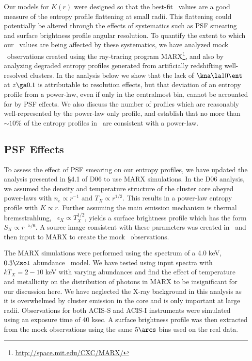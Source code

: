 Our models for $K(r)$ were designed so that the best-fit \kna\ values
are a good measure of the entropy profile flattening at small
radii. This flattening could potentially be altered through the
effects of systematics such as PSF smearing and surface brightness
profile angular resolution. To quantify the extent to which our
\kna\ values are being affected by these systematics, we have analyzed
mock \chandra\ observations created using the ray-tracing program
MARX\footnote{\url{http://space.mit.edu/CXC/MARX/}}, and also by
analyzing degraded entropy profiles generated from artificially
redshifting well-resolved clusters. In the analysis below we show that
the lack of $\kna \la 10 \ent$ at $z \ga 0.1$ is attributable to
resolution effects, but that deviation of an entropy profile from a
power-law, even if only in the centralmost bin, cannot be accounted
for by PSF effects. We also discuss the number of profiles which are
reasonably well-represented by the power-law only profile, and
establish that no more than $\sim 10\%$ of the entropy profiles in
\accept\ are consistent with a power-law.

\subsection{PSF Effects}
\label{sec:entsupppsf}

To assess the effect of PSF smearing on our entropy profiles, we have
updated the analysis presented in \S4.1 of D06 to use MARX
simulations. In the D06 analysis, we assumed the density and
temperature structure of the cluster core obeyed power-laws with $n_e
\propto r^{-1}$ and $T_X \propto r^{1/3}$. This results in a power-law
entropy profile with $K \propto r$. Further assuming the main emission
mechanism is thermal bremsstrahlung, \ie\ $\epsilon_X \propto
T_X^{1/2}$, yields a surface brightness profile which has the form
$S_X \propto r^{-5/6}$. A source image consistent with these
parameters was created in \idl\ and then input to MARX to create the
mock \chandra\ observations.

The MARX simulations were performed using the spectrum of a 4.0 keV,
$0.3 \Zsol$ abundance \mekal\ model. We have tested using input
spectra with $kT_X = 2-10$ keV with varying abundances and find the
effect of temperature and metallicity on the distribution of photons
in MARX to be insignificant for our discussion here. We have neglected
the X-ray background in this analysis as it is overwhelmed by cluster
emission in the core and is only important at large
radii. Observations for both ACIS-S and ACIS-I instruments were
simulated using an exposure time of 40 ksec. A surface brightness
profile was then extracted from the mock observations using the same
$5\arcs$ bins used on the real data.

